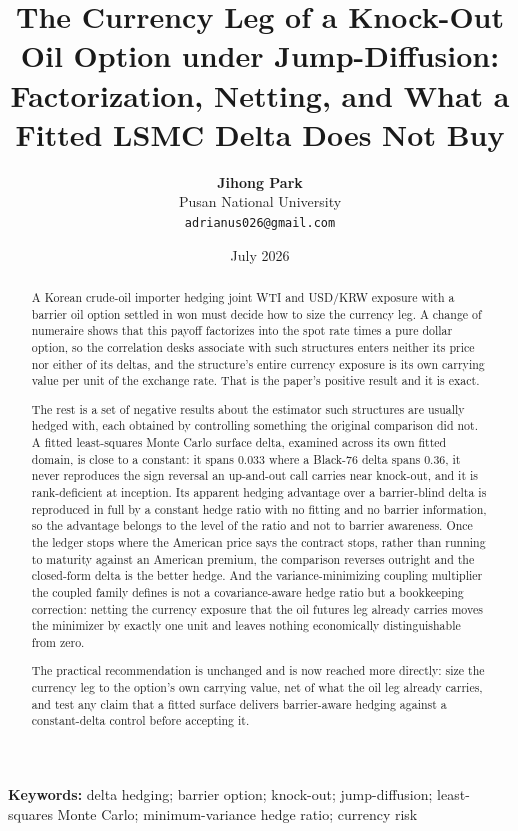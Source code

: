 \documentclass[11pt,a4paper]{article}
\title{\textbf{The Currency Leg of a Knock-Out Oil Option under Jump-Diffusion:\\ Factorization, Netting, and What a Fitted LSMC Delta Does Not Buy}}
\author{\textbf{Jihong Park} \\ Pusan National University \\ \texttt{adrianus026@gmail.com}}
\date{July 2026}
\begin{document}
\maketitle

\begin{abstract}
A Korean crude-oil importer hedging joint WTI and USD/KRW exposure with a barrier oil option settled in won must decide how to size the currency leg. A change of numeraire shows that this payoff factorizes into the spot rate times a pure dollar option, so the correlation desks associate with such structures enters neither its price nor either of its deltas, and the structure's entire currency exposure is its own carrying value per unit of the exchange rate. That is the paper's positive result and it is exact.

The rest is a set of negative results about the estimator such structures are usually hedged with, each obtained by controlling something the original comparison did not. A fitted least-squares Monte Carlo surface delta, examined across its own fitted domain, is close to a constant: it spans $0.033$ where a Black-76 delta spans $0.36$, it never reproduces the sign reversal an up-and-out call carries near knock-out, and it is rank-deficient at inception. Its apparent hedging advantage over a barrier-blind delta is reproduced in full by a constant hedge ratio with no fitting and no barrier information, so the advantage belongs to the level of the ratio and not to barrier awareness. Once the ledger stops where the American price says the contract stops, rather than running to maturity against an American premium, the comparison reverses outright and the closed-form delta is the better hedge. And the variance-minimizing coupling multiplier the coupled family defines is not a covariance-aware hedge ratio but a bookkeeping correction: netting the currency exposure that the oil futures leg already carries moves the minimizer by exactly one unit and leaves nothing economically distinguishable from zero.

The practical recommendation is unchanged and is now reached more directly: size the currency leg to the option's own carrying value, net of what the oil leg already carries, and test any claim that a fitted surface delivers barrier-aware hedging against a constant-delta control before accepting it.
\end{abstract}

\vspace{0.5em}
\noindent\textbf{Keywords:} delta hedging; barrier option; knock-out; jump-diffusion; least-squares Monte Carlo; minimum-variance hedge ratio; currency risk
\end{document}
